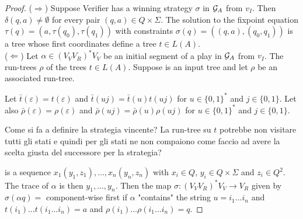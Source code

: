 \documentclass[runningheads,a4paper]{llncs}
\begin{document}
\begin{proof}
\noindent ($\Rightarrow$) Suppose Verifier has a winning strategy $\sigma$ in $\mathcal{G}_{A}$ from $v_I$. Then $\delta(q,a) \neq \emptyset$ for every pair $(q,a) \in Q \times \Sigma$. The solution to the fixpoint equation  
 $\tau(q) = (a,\tau(q_0),\tau(q_1))$ with constraints $\sigma(q) = ((q,a),(q_0, q_1))$ is a tree whose first coordinates
  define a tree $t \in L(A)$.\\

\noindent ($\Leftarrow$) Let $\alpha \in (V_VV_R)^*V_V$ be an initial segment of a play in $\mathcal{G}_{A}$ from $v_I$. 
 The run-trees $\rho$ of the trees $t \in L(A)$.
Suppose  is an input tree and let $\rho$ be an associated run-tree. 

Let $\bar{t}(\varepsilon) = t(\varepsilon)$ and $\bar{t}(uj) = \bar{t}(u)t(uj)$ for $u \in \{0,1\}^*$ and $j \in \{0,1\}$. 
 Let also $\bar{\rho}(\varepsilon) = \rho(\varepsilon)$ and $\bar{\rho}(uj) = \bar{\rho}(u)\rho(uj)$ for $u \in \{0,1\}^*$ and $j \in \{0,1\}$.

Come si fa a definire la strategia vincente? La run-tree su $t$ potrebbe non visitare tutti gli stati e quindi per gli stati ne non compaiono come faccio ad avere la scelta giusta del successore per la strategia? 

 is a sequence $x_1(y_1,z_1), \ldots,x_n(y_n,z_n)$ with $x_i \in Q$, $y_i \in Q \times \Sigma$ and $z_i \in Q^2$. The trace of $\alpha$ is then $y_1,\ldots, y_n$. Then the map $\sigma: (V_VV_R)^*V_V \to V_R$ given by $\sigma(\alpha q) = $ component-wise first  if $\alpha$ "contains" the string $u = i_1\ldots i_n$ and $t(i_1)\ldots t(i_1\ldots i_n) = a$ and $\rho(i_1)\ldots \rho(i_1\ldots i_n) = q$. 

\end{proof}

%
\end{document}
